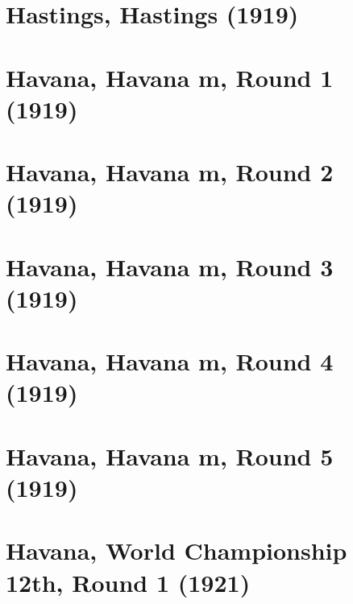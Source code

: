 \documentclass[11pt]{article}
\begin{document}
\clearpage

\section{Hastings, Hastings (1919)}


\clearpage



\clearpage



\clearpage



\clearpage



\clearpage



\clearpage

\section{Havana, Havana m, Round 1 (1919)}


\clearpage

\section{Havana, Havana m, Round 2 (1919)}


\clearpage

\section{Havana, Havana m, Round 3 (1919)}


\clearpage

\section{Havana, Havana m, Round 4 (1919)}


\clearpage

\section{Havana, Havana m, Round 5 (1919)}


\clearpage

\section{Havana, World Championship 12th, Round 1 (1921)}

\end{document}
